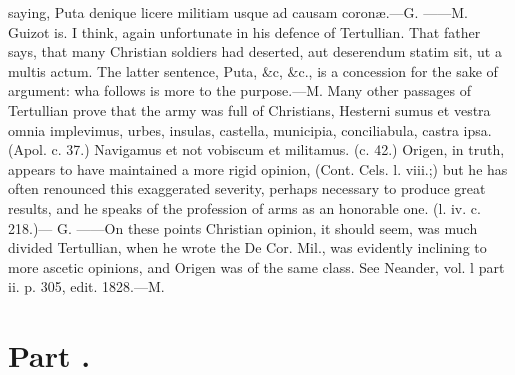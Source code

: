 {saying, Puta denique licere militiam usque ad causam coronæ.—G.
——M. Guizot is. I think, again unfortunate in his defence of
Tertullian. That father says, that many Christian soldiers had
deserted, aut deserendum statim sit, ut a multis actum. The
latter sentence, Puta, \&c, \&c., is a concession for the sake of
argument: wha follows is more to the purpose.—M. Many other
passages of Tertullian prove that the army was full of
Christians, Hesterni sumus et vestra omnia implevimus, urbes,
insulas, castella, municipia, conciliabula, castra ipsa. (Apol.
c. 37.) Navigamus et not vobiscum et militamus. (c. 42.) Origen,
in truth, appears to have maintained a more rigid opinion, (Cont.
Cels. l. viii.;) but he has often renounced this exaggerated
severity, perhaps necessary to produce great results, and he
speaks of the profession of arms as an honorable one. (l. iv. c.
218.)— G. ——On these points Christian opinion, it should seem,
was much divided Tertullian, when he wrote the De Cor. Mil., was
evidently inclining to more ascetic opinions, and Origen was of
the same class. See Neander, vol. l part ii. p. 305, edit.
1828.—M.}


\section{Part \thesection.}

